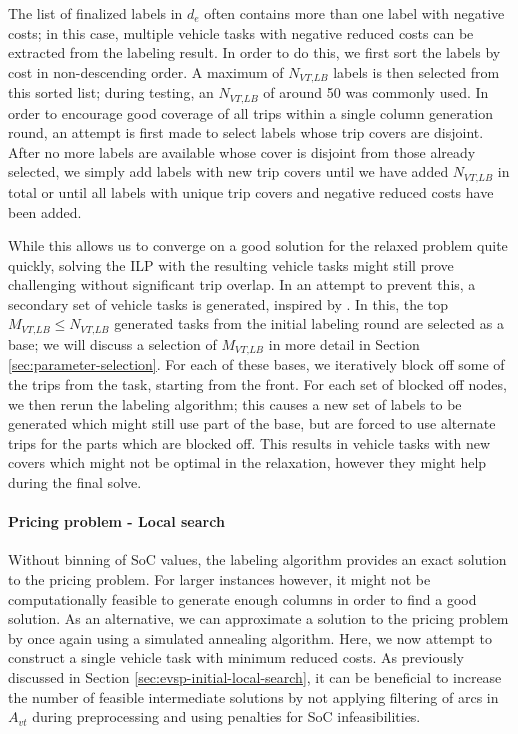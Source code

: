 \documentclass[]{article}
\begin{document}
The list of finalized labels in $d_e$ often contains more than one label with negative costs; in this case, multiple vehicle tasks with negative reduced costs can be extracted from the labeling result. In order to do this, we first sort the labels by cost in non-descending order. A maximum of $N_{\textit{VT,LB}}$ labels is then selected from this sorted list; during testing, an $N_{\textit{VT,LB}}$ of around 50 was commonly used. In order to encourage good coverage of all trips within a single column generation round, an attempt is first made to select labels whose trip covers are disjoint. After no more labels are available whose cover is disjoint from those already selected, we simply add labels with new trip covers until we have added $N_{\textit{VT,LB}}$ in total or until all labels with unique trip covers and negative reduced costs have been added. 

While this allows us to converge on a good solution for the relaxed problem quite quickly, solving the ILP with the resulting vehicle tasks might still prove challenging without significant trip overlap. In an attempt to prevent this, a secondary set of vehicle tasks is generated, inspired by \cite{Guido2009}. In this, the top $M_{\textit{VT,LB}} \leq N_{\textit{VT,LB}}$ generated tasks from the initial labeling round are selected as a base; we will discuss a selection of $M_{\textit{VT,LB}}$ in more detail in Section \ref{sec:parameter-selection}. For each of these bases, we iteratively block off some of the trips from the task, starting from the front. For each set of blocked off nodes, we then rerun the labeling algorithm; this causes a new set of labels to be generated which might still use part of the base, but are forced to use alternate trips for the parts which are blocked off. This results in vehicle tasks with new covers which might not be optimal in the relaxation, however they might help during the final solve.

\paragraph{Pricing problem - Local search} \label{sec:evsp-pricing-local-search}
Without binning of SoC values, the labeling algorithm provides an exact solution to the pricing problem. For larger instances however, it might not be computationally feasible to generate enough columns in order to find a good solution. As an alternative, we can approximate a solution to the pricing problem by once again using a simulated annealing algorithm. Here, we now attempt to construct a single vehicle task with minimum reduced costs. As previously discussed in Section \ref{sec:evsp-initial-local-search}, it can be beneficial to increase the number of feasible intermediate solutions by not applying filtering of arcs in $A_{vt}$ during preprocessing and using penalties for SoC infeasibilities.
\end{document}

